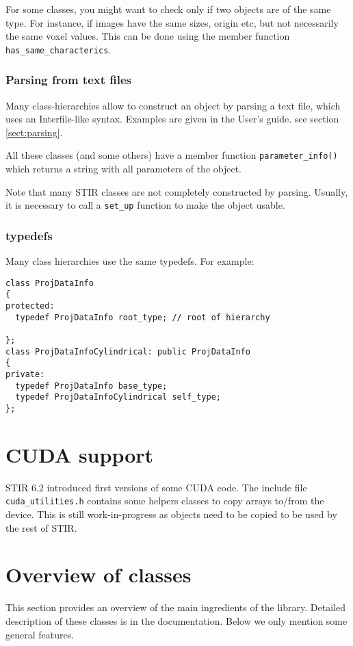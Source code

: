 \documentclass{article}
\begin{document}
For some classes, you might want to check only if two objects are of the same
type. For instance, if images have the same sizes, origin etc, but not 
necessarily the same voxel values. This can be done using the member
function \texttt{has\_same\_characterics}.

\subsubsection{Parsing from text files}
Many class-hierarchies allow to construct an object by parsing a 
text file, which uses an Interfile-like syntax. Examples
are given in the User's guide. see section \ref{sect:parsing}.

All these classes (and some others) have a member function 
\texttt{parameter\_info()} which returns a string with all parameters
of the object.

Note that many STIR classes are not completely constructed by parsing.
Usually, it is necessary to call a \texttt{set\_up} function to make
the object usable.

\subsubsection{typedefs}
Many class hierarchies use the same typedefs. For example:
\begin{verbatim}
class ProjDataInfo
{
protected:
  typedef ProjDataInfo root_type; // root of hierarchy
  
};
class ProjDataInfoCylindrical: public ProjDataInfo
{
private:
  typedef ProjDataInfo base_type;
  typedef ProjDataInfoCylindrical self_type;
};
\end{verbatim}

\section{CUDA support}
STIR 6.2 introduced first versions of some CUDA code. The include file
\texttt{cuda\_utilities.h} contains some helpers classes to copy
arrays to/from the device. This is still work-in-progress as objects
need to be copied to be used by the rest of STIR.

\section{
Overview of classes}

This section provides an overview of the main ingredients of 
the library. Detailed description of these classes is in the documentation. 
Below we only mention some general features.
\end{document}
